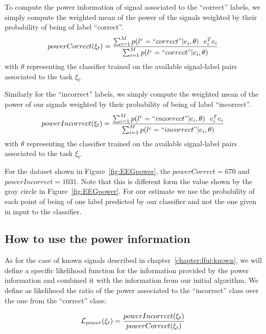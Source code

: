 To compute the power information of signal associated to the ``correct'' labels, we simply compute the weighted mean of the power of the signals weighted by their probability of being of label ``correct''. 
\begin{eqnarray}
powerCorrect(\xi_t) = \frac{\sum_{i = 1}^{M} p(l^c = ``correct"| e_i , \theta) ~~ e_i^T e_i}{\sum_{i = 1}^{M} p(l^c = ``correct"| e_i , \theta)}
\label{eq:powerCorrect}
\end{eqnarray}
with $\theta$ representing the classifier trained on the available signal-label pairs associated to the task $\xi_t$.

Similarly for the ``incorrect'' labels, we simply compute the weighted mean of the power of our signals weighted by their probability of being of label ``incorrect''. 
\begin{eqnarray}
powerIncorrect(\xi_t) = \frac{\sum_{i = 1}^{M} p(l^c = ``incorrect"| e_i , \theta) ~~ e_i^T e_i}{\sum_{i = 1}^{M} p(l^c = ``incorrect"| e_i , \theta)}
\label{eq:powerIncorrect}
\end{eqnarray}
with $\theta$ representing the classifier trained on the available signal-label pairs associated to the task $\xi_t$.

For the dataset shown in Figure~\ref{fig:EEGpower}, the $powerCorrect = 670$ and $powerIncorrect = 1031$. Note that this is different form the value shown by the gray circle in Figure~\ref{fig:EEGpower}. For our estimate we use the probability of each point of being of one label predicted by our classifier and not the one given in input to the classifier. 

\subsection{How to use the power information}

As for the case of known signals described in chapter~\ref{chapter:lfui:known}, we will define a specific likelihood function for the information provided by the power information and combined it with the information from our initial algorithm. We define as likelihood the ratio of the power associated to the ``incorrect'' class over the one from the ``correct'' class:

\begin{eqnarray}
\mathcal{L}_{power}(\xi_t) = \frac{powerIncorrect(\xi_t)}{powerCorrect(\xi_t)}
\label{eq:power}
\end{eqnarray}

